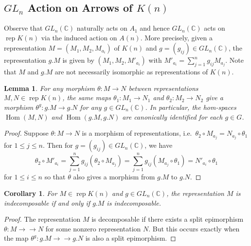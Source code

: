 \documentclass{amsart}
\newtheorem{corollary}[theorem]{Corollary}
\newtheorem{lemma}[theorem]{Lemma}
\newcommand{\rep}{\operatorname{rep}}
\newcommand{\CC}{\mathbb{C}}
\newcommand{\Hom}{\operatorname{Hom}}
\newcommand{\onto}{\to\!\!\!\!\!\to}
\begin{document}
\subsection{$GL_n$ Action on Arrows of $K(n)$}
Observe that $GL_n(\CC)$ naturally acts on $A_1$ and hence $GL_n(\CC)$ acts on $\rep K(n)$ via the induced action on $A(n)$.
More precisely, given a representation $M=(M_1,M_2,M_{a_i})$ of $K(n)$ and $g=(g_{ij})\in GL_n(\CC)$, the representation $g.M$ is given by $(M_1,M_2,M'_{a_i})$ with $M'_{a_i}=\sum\limits_{j=1}^n g_{ij}M_{a_j}$.
Note that $M$ and $g.M$ are not necessarily isomorphic as representations of $K(n)$.
\begin{lemma}
  \label{le:hom equivariance}
  For any morphism $\theta:M\to N$ between representations $M,N\in\rep K(n)$, the same maps $\theta_1:M_1\to N_1$ and $\theta_2:M_2\to N_2$ give a morphism $\theta^g:g.M\to g.N$ for any $g\in GL_n(\CC)$.
  In particular, the hom-spaces $\Hom(M,N)$ and $\Hom(g.M,g.N)$ are canonically identified for each $g\in G$.
\end{lemma}
\begin{proof}
  Suppose $\theta:M\to N$ is a morphism of representations, i.e.\ $\theta_2\circ M_{a_j}=N_{a_j}\circ\theta_1$ for $1\le j\le n$.
  Then for $g=(g_{ij})\in GL_n(\CC)$, we have
  \[\theta_2\circ M'_{a_i}=\sum\limits_{j=1}^n g_{ij}(\theta_2\circ M_{a_j})=\sum\limits_{j=1}^n g_{ij}(M_{a_j}\circ\theta_1)=N'_{a_i}\circ\theta_1\]
  for $1\le i\le n$ so that $\theta$ also gives a morphism from $g.M$ to $g.N$. 
\end{proof}
\begin{corollary}
  \label{cor:indecomposability}
  For $M\in\rep K(n)$ and $g\in GL_n(\CC)$, the representation $M$ is indecomposable if and only if $g.M$ is indecomposable.
\end{corollary}
\begin{proof}
  The representation $M$ is decomposable if there exists a split epimorphism $\theta:M\onto N$ for some nonzero representation $N$.
  But this occurs exactly when the map $\theta^g:g.M\onto g.N$ is also a split epimorphism.
\end{proof}

\end{document}
